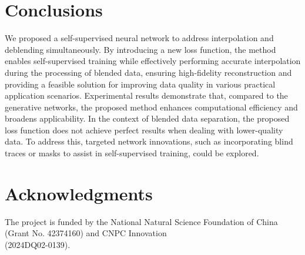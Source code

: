 \documentclass{segabs}
\begin{document}
\section{Conclusions}
We proposed a self-supervised neural network to address interpolation and deblending simultaneously. By introducing a new loss function, the method enables self-supervised training while effectively performing accurate interpolation during the processing of blended data, ensuring high-fidelity reconstruction and providing a feasible solution for improving data quality in various practical application scenarios. Experimental results demonstrate that, compared to the generative networks, the proposed method enhances computational efficiency and broadens applicability. In the context of blended data separation, the proposed loss function does not achieve perfect results when dealing with lower-quality data. To address this, targeted network innovations, such as incorporating blind traces or masks to assist in self-supervised training, could be explored.

\section{Acknowledgments}
The project is funded by the National Natural Science Foundation of China (Grant No. 42374160) and  CNPC Innovation\\(2024DQ02-0139).






%





\let\cleardoublepage\relax
\let\clearpage\relax
\end{document}
